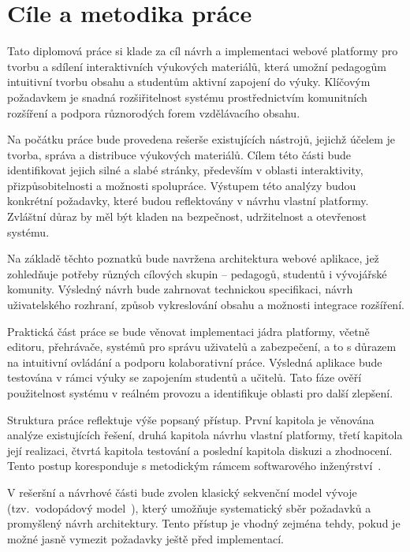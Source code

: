 \chapter*{Cíle a metodika práce}

Tato diplomová práce si klade za cíl návrh a implementaci webové platformy pro tvorbu a sdílení interaktivních výukových materiálů, která umožní pedagogům intuitivní tvorbu obsahu a studentům aktivní zapojení do výuky. 
Klíčovým požadavkem je snadná rozšiřitelnost systému prostřednictvím komunitních rozšíření a podpora různorodých forem vzdělávacího obsahu.

Na počátku práce bude provedena rešerše existujících nástrojů, jejichž účelem je tvorba, správa a distribuce výukových materiálů. 
Cílem této části bude identifikovat jejich silné a slabé stránky, především v oblasti interaktivity, přizpůsobitelnosti a možnosti spolupráce. 
Výstupem této analýzy budou konkrétní požadavky, které budou reflektovány v návrhu vlastní platformy. 
Zvláštní důraz by měl být kladen na bezpečnost, udržitelnost a otevřenost systému.

Na základě těchto poznatků bude navržena architektura webové aplikace, jež zohledňuje potřeby různých cílových skupin -- pedagogů, studentů i vývojářské komunity.
Výsledný návrh bude zahrnovat technickou specifikaci, návrh uživatelského rozhraní, způsob vykreslování obsahu a možnosti integrace rozšíření.

Praktická část práce se bude věnovat implementaci jádra platformy, včetně editoru, přehrávače, systémů pro správu uživatelů a zabezpečení, a to s důrazem na intuitivní ovládání a podporu kolaborativní práce.
Výsledná aplikace bude testována v rámci výuky se zapojením studentů a učitelů.
Tato fáze ověří použitelnost systému v reálném provozu a identifikuje oblasti pro další zlepšení.

Struktura práce reflektuje výše popsaný přístup. 
První kapitola je věnována analýze existujících řešení, druhá kapitola návrhu vlastní platformy, třetí kapitola její realizaci, čtvrtá kapitola testování a poslední kapitola diskuzi a zhodnocení. 
Tento postup koresponduje s metodickým rámcem softwarového inženýrství~\cite{laplante2007software}.

V rešeršní a návrhové části bude zvolen klasický sekvenční model vývoje (tzv.~vodopádový model~\cite{laplante2007software}), který umožňuje systematický sběr požadavků a promyšlený návrh architektury.
Tento přístup je vhodný zejména tehdy, pokud je možné jasně vymezit požadavky ještě před implementací.

